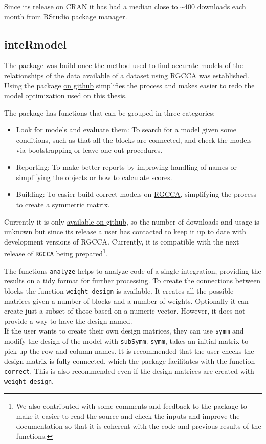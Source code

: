 \documentclass[
  12pt,
  a4paper,
  twoside,
  openright]{book}
\begin{document}
Since its release on CRAN it has had a median close to \textasciitilde400 downloads each month from RStudio package manager.

\FloatBarrier

\hypertarget{intermodel}{%
\subsection{inteRmodel}\label{intermodel}}

The package was build once the method used to find accurate models of the relationships of the data available of a dataset using RGCCA was established.
Using the package \href{https://github.com/llrs/intermodel}{on github} simplifies the process and makes easier to redo the model optimization used on this thesis.

The package has functions that can be grouped in three categories:

\begin{itemize}
\item
  Look for models and evaluate them:
  To search for a model given some conditions, such as that all the blocks are connected, and check the models via bootstrapping or leave one out procedures.
\item
  Reporting: To make better reports by improving handling of names or simplifying the objects or how to calculate scores.
\item
  Building: To easier build correct models on \protect\hyperlink{acronyms_RGCCA}{RGCCA}, simplifying the process to create a symmetric matrix.
\end{itemize}

Currently it is only \href{https:intermodel.llrs.dev}{available on github}, so the number of downloads and usage is unknown but since its release a user has contacted to keep it up to date with development versions of RGCCA.
Currently, it is compatible with the next release of \href{https://github.com/rgcca-factory/RGCCA/tree/CRAN}{\texttt{RGCCA} being prepared}\footnote{We also contributed with some comments and feedback to the package to make it easier to read the source and check the inputs and improve the documentation so that it is coherent with the code and previous results of the functions.}.

The functions \texttt{analyze} helps to analyze code of a single integration, providing the results on a tidy format for further processing.
To create the connections between blocks the function \texttt{weight\_design} is available.
It creates all the possible matrices given a number of blocks and a number of weights.
Optionally it can create just a subset of those based on a numeric vector.
However, it does not provide a way to have the design named.\\
If the user wants to create their own design matrices, they can use \texttt{symm} and modify the design of the model with \texttt{subSymm}.
\texttt{symm}, takes an initial matrix to pick up the row and column names.
It is recommended that the user checks the design matrix is fully connected, which the package facilitates with the function \texttt{correct}.
This is also recommended even if the design matrices are created with \texttt{weight\_design}.
\end{document}
